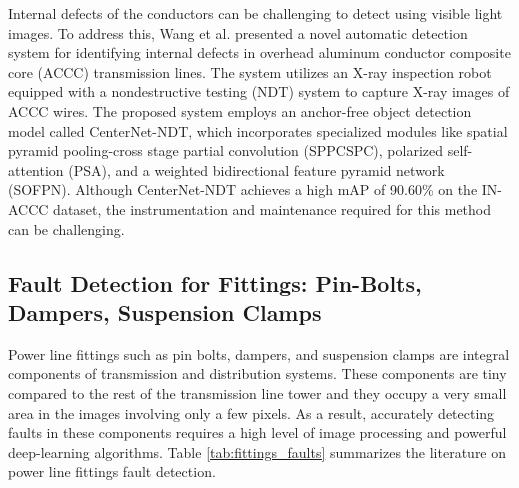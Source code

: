 Internal defects of the conductors can be challenging to detect using visible light images. To address this, Wang et al. \cite{wang_internal_2023} presented a novel automatic detection system for identifying internal defects in overhead aluminum conductor composite core (ACCC) transmission lines. The system utilizes an X-ray inspection robot equipped with a nondestructive testing (NDT) system to capture X-ray images of ACCC wires. The proposed system employs an anchor-free object detection model called CenterNet-NDT, which incorporates specialized modules like spatial pyramid pooling-cross stage partial convolution (SPPCSPC), polarized self-attention (PSA), and a weighted bidirectional feature pyramid network (SOFPN). Although CenterNet-NDT achieves a high mAP of 90.60\% on the IN-ACCC dataset, the instrumentation and maintenance required for this method can be challenging. 

\subsection{Fault Detection for Fittings: Pin-Bolts, Dampers, Suspension Clamps}
Power line fittings such as pin bolts, dampers, and suspension clamps are integral components of transmission and distribution systems. These components are tiny compared to the rest of the transmission line tower and they occupy a very small area in the images involving only a few pixels. As a result, accurately detecting faults in these components requires a high level of image processing and powerful deep-learning algorithms. Table \ref{tab:fittings_faults} summarizes the literature on power line fittings fault detection.

